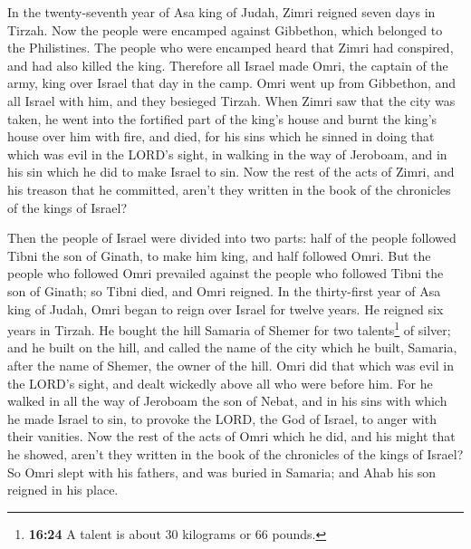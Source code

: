  In the twenty-seventh year of Asa king of Judah, Zimri
reigned seven days in Tirzah. Now the people were encamped against
Gibbethon, which belonged to the Philistines.  The people
who were encamped heard that Zimri had conspired, and had also killed
the king. Therefore all Israel made Omri, the captain of the army, king
over Israel that day in the camp.  Omri went up from
Gibbethon, and all Israel with him, and they besieged Tirzah.
 When Zimri saw that the city was taken, he went into the
fortified part of the king's house and burnt the king's house over him
with fire, and died,  for his sins which he sinned in
doing that which was evil in the LORD's sight, in walking in the way of
Jeroboam, and in his sin which he did to make Israel to sin.
 Now the rest of the acts of Zimri, and his treason that
he committed, aren't they written in the book of the chronicles of the
kings of Israel?

 Then the people of Israel were divided into two parts:
half of the people followed Tibni the son of Ginath, to make him king,
and half followed Omri.  But the people who followed Omri
prevailed against the people who followed Tibni the son of Ginath; so
Tibni died, and Omri reigned.  In the thirty-first year
of Asa king of Judah, Omri began to reign over Israel for twelve years.
He reigned six years in Tirzah.  He bought the hill
Samaria of Shemer for two talents\footnote{\textbf{16:24} A talent is
  about 30 kilograms or 66 pounds.} of silver; and he built on the hill,
and called the name of the city which he built, Samaria, after the name
of Shemer, the owner of the hill.  Omri did that which
was evil in the LORD's sight, and dealt wickedly above all who were
before him.  For he walked in all the way of Jeroboam the
son of Nebat, and in his sins with which he made Israel to sin, to
provoke the LORD, the God of Israel, to anger with their vanities.
 Now the rest of the acts of Omri which he did, and his
might that he showed, aren't they written in the book of the chronicles
of the kings of Israel?  So Omri slept with his fathers,
and was buried in Samaria; and Ahab his son reigned in his place.

